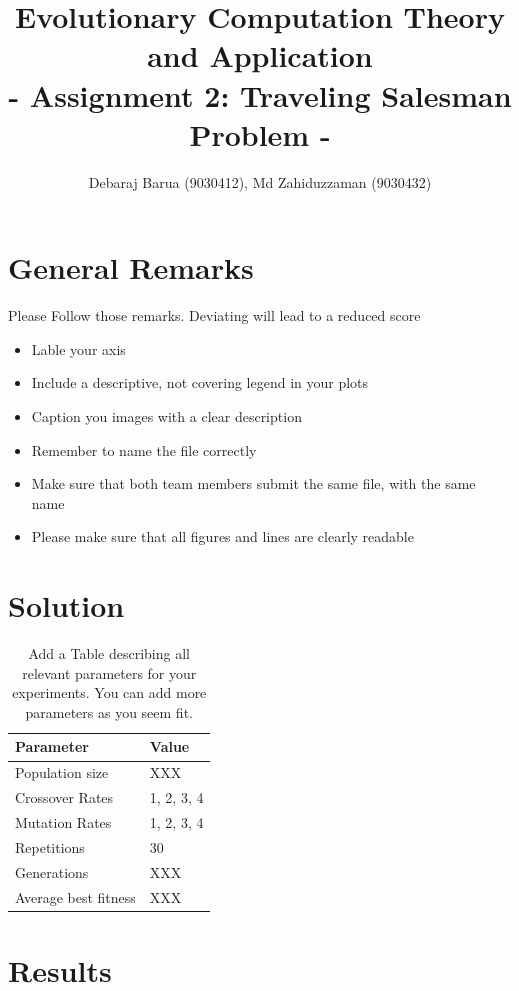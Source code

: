 \documentclass[a4paper, 12pt]{article}
\title{Evolutionary Computation Theory and Application  \\
				- Assignment 2: Traveling Salesman Problem -}
\author{Debaraj Barua (9030412), Md Zahiduzzaman (9030432)}
\date{}
\begin{document}
\maketitle

\section{General Remarks }

Please Follow those remarks. Deviating will lead to a reduced score

\begin{itemize}
	\item Lable your axis 
	\item Include a descriptive, not covering legend in your plots
	\item Caption you images with a clear description
	\item Remember to name the file correctly
	\item Make sure that both team members submit the same file, with the same name
	\item Please make sure that all figures and lines are clearly readable
\end{itemize}

\section{Solution}

\begin{table} [h!]
	  \centering
\begin{tabular}{|l|l|}
\hline
\textbf{Parameter} & \textbf{Value}   \\
\hline
Population size & XXX \\
\hline
Crossover Rates &  1, 2, 3, 4 \\
\hline
Mutation Rates & 1, 2, 3, 4 \\
\hline
Repetitions & 30 \\
\hline
Generations & XXX \\
\hline
Average best fitness		 & XXX \\
\hline
\end{tabular}
\caption{Add a Table describing all relevant parameters for your experiments. You can add more parameters as you seem fit. }
\label{table:defparams}
\end{table}

\newpage
\section{Results}
\end{document}
